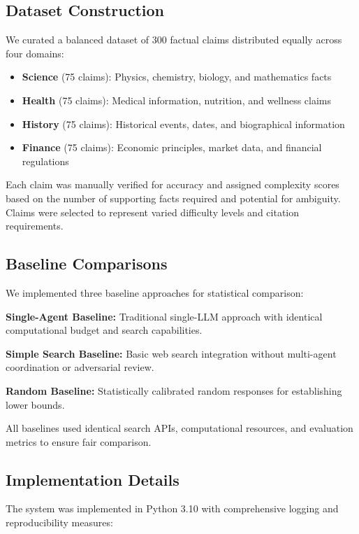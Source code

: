 \documentclass{article}
\begin{document}
\subsection{Dataset Construction}

We curated a balanced dataset of 300 factual claims distributed equally across four domains:

\begin{itemize}
    \item \textbf{Science} (75 claims): Physics, chemistry, biology, and mathematics facts
    \item \textbf{Health} (75 claims): Medical information, nutrition, and wellness claims  
    \item \textbf{History} (75 claims): Historical events, dates, and biographical information
    \item \textbf{Finance} (75 claims): Economic principles, market data, and financial regulations
\end{itemize}

Each claim was manually verified for accuracy and assigned complexity scores based on the number of supporting facts required and potential for ambiguity. Claims were selected to represent varied difficulty levels and citation requirements.

\subsection{Baseline Comparisons}

We implemented three baseline approaches for statistical comparison:

\textbf{Single-Agent Baseline:} Traditional single-LLM approach with identical computational budget and search capabilities.

\textbf{Simple Search Baseline:} Basic web search integration without multi-agent coordination or adversarial review.

\textbf{Random Baseline:} Statistically calibrated random responses for establishing lower bounds.

All baselines used identical search APIs, computational resources, and evaluation metrics to ensure fair comparison.

\subsection{Implementation Details}

The system was implemented in Python 3.10 with comprehensive logging and reproducibility measures:
\end{document}
